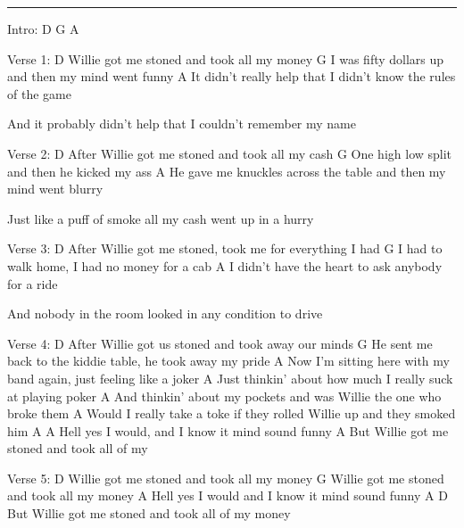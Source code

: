 \noindent\rule{\columnwidth}{1pt}

\begin{lstsong}
Intro:  D  G  A
 
Verse 1:
D
Willie got me stoned and took all my money
      G
I was fifty dollars up and then my mind went funny
   A
It didn't really help that I didn't know the rules of the game
 
And it probably didn't help that I couldn't remember my name
 
Verse 2:
      D
After Willie got me stoned and took all my cash
    G
One high low split and then he kicked my ass
           A
He gave me knuckles across the table and then my mind went blurry
 
Just like a puff of smoke all my cash went up in a hurry
 
Verse 3:
      D
After Willie got me stoned, took me for everything I had
  G
I had to walk home, I had no money for a cab
  A
I didn't have the heart to ask anybody for a ride
 
And nobody in the room looked in any condition to drive
 
Verse 4:
      D
After Willie got us stoned and took away our minds
           G
He sent me back to the kiddie table, he took away my pride
        A
Now I'm sitting here with my band again, just feeling like a joker
     A
Just thinkin' about how much I really suck at playing poker
    A
And thinkin' about my pockets and was Willie the one who broke them
        A
Would I really take a toke if they rolled Willie up and they smoked him
     A                  A
Hell yes I would, and I know it mind sound funny
    A
But Willie got me stoned and took all of my
 
Verse 5:
D
Willie got me stoned and took all my money
G
Willie got me stoned and took all my money
     A
Hell yes I would and I know it mind sound funny
    A                                         D
But Willie got me stoned and took all of my money
\end{lstsong}
\newpage

